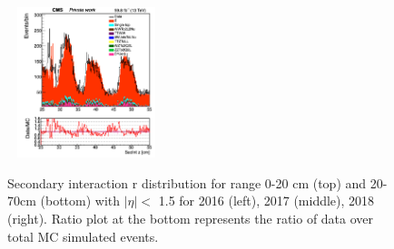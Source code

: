 \documentclass{cernatlasnote}
\begin{document}
\begin{figure}[htp]
 \includegraphics[width=4.6cm, height=4.4cm]{images/emu_channel/2018/18_Plots_for_r_z/SecInt_z_Selec_eta_r_20_70Linear.png}\\
 \caption{Secondary interaction r distribution for range 0-20 cm (top)  and 20-70cm (bottom) with $|\eta|<$ 1.5 for 2016 (left), 2017 (middle), 2018 (right). Ratio plot at the bottom represents the ratio of data over total MC simulated events.}
 \label{fig:L0DATAMC}
  \end{figure}
\end{document}
